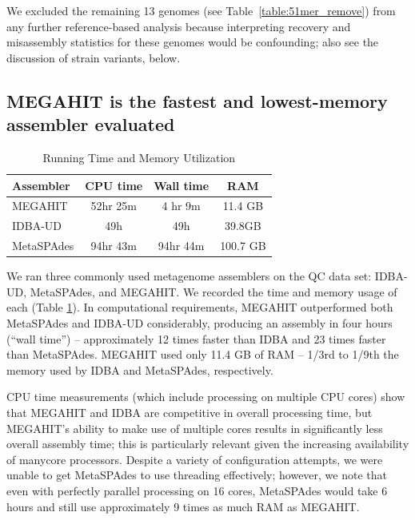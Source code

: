 \documentclass[11pt]{article}
\begin{document}
We excluded the remaining 13 genomes (see
Table~\ref{table:51mer_remove}) from any further reference-based
analysis because interpreting recovery and misassembly statistics for
these genomes would be confounding; also see the discussion of strain
variants, below.

\subsection*{MEGAHIT is the fastest and lowest-memory assembler evaluated}

 \begin{table}[h]
\caption{Running Time and Memory Utilization}
\centering
\begin{tabular}{|l|c|c|c|}
\hline
\textbf{Assembler} & \textbf{CPU time} & \textbf{Wall time} & \textbf{RAM} \\ [0.5ex]
\hline
MEGAHIT & 52hr 25m & 4 hr 9m & 11.4 GB \\
\hline
IDBA-UD & 49h & 49h & 39.8GB \\
\hline
MetaSPAdes & 94hr 43m & 94hr 44m & 100.7 GB \\
\hline

\end{tabular}
\label{table:time-memory}
\end{table}

We ran three commonly used metagenome assemblers on the QC data set:
IDBA-UD, MetaSPAdes, and MEGAHIT. We recorded the time and memory
usage of each (Table \ref{table:time-memory}).  In computational
requirements, MEGAHIT outperformed both MetaSPAdes and IDBA-UD
considerably, producing an assembly in four hours (``wall time'') --
approximately 12 times faster than IDBA and 23 times faster than
MetaSPAdes.  MEGAHIT used only 11.4 GB of RAM -- 1/3rd to 1/9th the
memory used by IDBA and MetaSPAdes, respectively.

CPU time measurements (which include processing on multiple CPU cores)
show that MEGAHIT and IDBA are competitive in overall processing time,
but MEGAHIT's ability to make use of multiple cores results in
significantly less overall assembly time; this is particularly
relevant given the increasing availability of manycore processors.  Despite a
variety of configuration attempts, we were unable to get MetaSPAdes to
use threading effectively; however, we note that even with perfectly
parallel processing on 16 cores, MetaSPAdes would take 6 hours and
still use approximately 9 times as much RAM as MEGAHIT.
\end{document}
